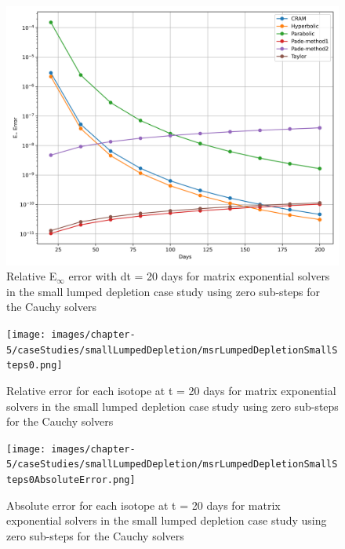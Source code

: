 \begin{figure}[p]
    \centering
    \includegraphics[width=5in]{images/chapter-5/caseStudies/smallLumpedDepletion/msrSmallLumpDepletionEinfErrorerrorSteps0.png}
    \caption{Relative E$_{\infty}$ error with dt = 20 days for matrix exponential solvers in the small lumped depletion case study using zero sub-steps for the Cauchy solvers}
    \label{fig:small_lumped_depletion_Einf_steps0}
\end{figure}

\clearpage

\begin{landscape}
\thispagestyle{mylandscape}
\begin{figure}[p]
    \centering
    \texttt{[image: images/chapter-5/caseStudies/smallLumpedDepletion/msrLumpedDepletionSmallSteps0.png]}
    \caption{Relative error for each isotope at t = 20 days for matrix exponential solvers in the small lumped depletion case study using zero sub-steps for the Cauchy solvers}
    \label{fig:small_lumped_depletion_species_relative_errors}
\end{figure}
\end{landscape}

\clearpage

\begin{landscape}
\thispagestyle{mylandscape}
\begin{figure}[p]
    \centering
    \texttt{[image: images/chapter-5/caseStudies/smallLumpedDepletion/msrLumpedDepletionSmallSteps0AbsoluteError.png]}
    \caption{Absolute error for each isotope at t = 20 days for matrix exponential solvers in the small lumped depletion case study using zero sub-steps for the Cauchy solvers}
    \label{fig:small_lumped_depletion_species_absolute_errors}
\end{figure}
\end{landscape}


